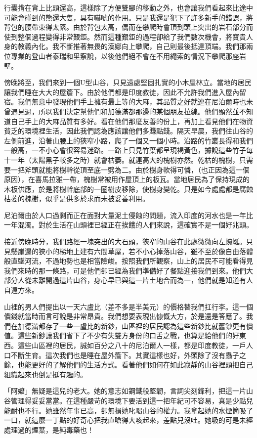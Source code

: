 行囊揹在背上比頭還高，這樣除了方便雙腳的移動之外，也會讓我們看起來比途中可能會碰到的熊還大隻，具有嚇唬的作用。只是我還是犯下了許多新手的錯誤，將背包的腰帶束得太緊。由於背包太高，偶而在攀爬時會頂到頭上突出的岩石部分而使到整個過程變得非常艱鉅。然而這種艱鉅的過程卻給了我們數次機會，將寶貴人身的教義內化。我不斷推著無畏的漢娜向上攀爬，自己則最後抵達頂端。我們那兩位專業的登山者泰瑞和里察說，以後他們絕不會在不用繩索的情況下攀爬那座岩壁。

傍晚將至，我們來到一個U型山谷，只見遠處堅固扎實的小木屋林立。當地的居民讓我們睡在大大的屋簷下。由於他們都是印度教徒，因此不允許我們進入屋內留宿。我們無意中發現他們手上擁有最上等的大麻，其品質之好就連在尼泊爾時也未曾遇見過，所以我們決定幫他們和加德滿都那邊的某個朋友拉線。他們顯然並不知道自己手上的大麻品質有多好。看在他們那麼友善的份上，再加上看見他們在物資貧乏的環境裡生活，因此我們認為應該讓他們多賺點錢。隔天早晨，我們往山谷的左側前進，沿著山腰上的狹窄小路，爬了一個又一個小時。沿路的竹叢長得和我們一般高，一不小心會很容易迷路。一路上只見竹葉都呈現褐黃色，據說這些竹子每十一年（太陽黑子較多之時）就會枯萎。就連高大的槐樹亦然。乾枯的槐樹，只需要一把斧頭就能將樹幹從頂至底一劈為二。由於樹身軟得可憐，（也正因為這一個原因），在喜馬拉雅一帶，槐樹常被用作屋頂上的板瓦。當地居民為了保持現成的木板供應，於是將樹幹底部的一圈樹皮移除，使樹身變乾。只是如今處處都是腐蝕枯萎的槐樹，似乎是供多於求而未被妥善利用。

尼泊爾由於人口過剩而正在面對大量泥土侵蝕的問題，流入印度的河水也是一年比一年混濁。對於生活在山頭裡已經正在挨餓的人們來說，這確實不是一個好兆頭。

接近傍晚時分，我們路經一塊突出的大石頭，狹窄的山谷在此處微微向左蜿蜒。只見懸崖邊的狹小的梯地上建有六間草屋，若不小心掉落山谷，雖不至於像自由落體般直墜河流，不過地勢也是相當險峻。按照我們所觀察，山上的居民不可能看得見我們來時的那一條路，可是他們卻已經為我們準備好了餐點迎接我們到來。他們大部分人從未離開過這片山谷，身心早已與這一片土地合而為一，他們就是知道有人自遠方來。

山裡的男人們提出以一天六盧比（差不多是半美元）的價格替我們扛行李。這一個價錢就當時而言可說是非常昂貴。我們想要表現出慷慨大方，於是還是答應了。我們在加德滿都存了一些一盧比的新鈔，山區裡的居民認為這些新鈔比就舊鈔更有價值。這些新鈔讓我們省下了不少有失雙方身份的口舌之戰，也算是給他們的好東西。這些山區裡的居民，誠如百分之八十的尼泊爾人一樣，都是印度教徒，一戶人口不斷生育。這次我們也是睡在屋外簷下。其實這樣也好，外頭除了沒有蟲子之餘，也能更好的了解他們的生活方式。看著他們如何在如此寂靜的山谷裡頭把自己組織起來也倒是挺有趣的。

「阿嬤」無疑是這兒的老大。她的意志如鋼鐵般堅韌，言詞尖刻鋒利，把這一片山谷管理得妥妥當當。在這種嚴苛的環境下要活到這一把年紀可不容易，真是少點兒能耐也不行。她雖然年事已高，卻無損她叱喝山谷的權力。我拿起她的水煙筒吸了一口，就這麼一丁點的好奇心把我直嗆得大咳起來，差點兒沒吐。她吸的可是未經處理過的煙葉，是純毒藥也！


